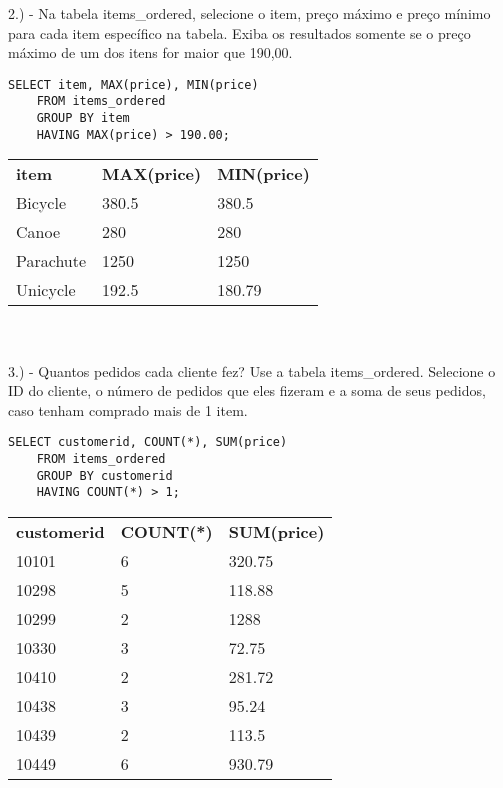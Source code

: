 2.) - Na tabela items\_ordered, selecione o item, preço máximo e preço mínimo para cada item específico na tabela. Exiba os resultados somente se o preço máximo de um dos itens for maior que 190,00.

\begin{lstlisting}
SELECT item, MAX(price), MIN(price)
	FROM items_ordered
	GROUP BY item
	HAVING MAX(price) > 190.00;
\end{lstlisting}


\begin{tabular}{lll}
    {\textbf{item}} & {\textbf{MAX(price)}} & {\textbf{MIN(price)}} \\
    {Bicycle}       & {380.5}               & {380.5}               \\
    {Canoe}         & {280}                 & {280}                 \\
    {Parachute}     & {1250}                & {1250}                \\
    {Unicycle}      & {192.5}               & {180.79}             
\end{tabular} \\ \\


3.) - Quantos pedidos cada cliente fez? Use a tabela items\_ordered. Selecione o ID do cliente, o número de pedidos que eles fizeram e a soma de seus pedidos, caso tenham comprado mais de 1 item.

\begin{lstlisting}
SELECT customerid, COUNT(*), SUM(price)
	FROM items_ordered
	GROUP BY customerid
	HAVING COUNT(*) > 1;
\end{lstlisting}

\begin{tabular}{lll}
    {\textbf{customerid}} & {\textbf{COUNT(*)}} & {\textbf{SUM(price)}} \\
    {10101}               & {6}                 & {320.75}              \\
    {10298}               & {5}                 & {118.88}              \\
    {10299}               & {2}                 & {1288}                \\
    {10330}               & {3}                 & {72.75}               \\
    {10410}               & {2}                 & {281.72}              \\
    {10438}               & {3}                 & {95.24}               \\
    {10439}               & {2}                 & {113.5}               \\
    {10449}               & {6}                 & {930.79}             
\end{tabular} \\ \\


